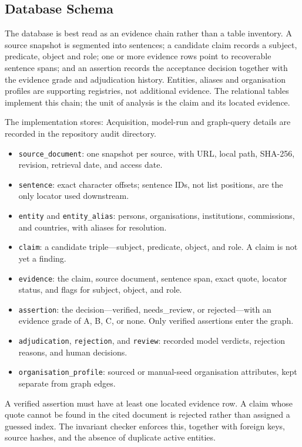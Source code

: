 \documentclass[11pt,a4paper]{article}
\begin{document}
\subsection{Database Schema}

The database is best read as an evidence chain rather than a table inventory. A source snapshot is segmented into sentences; a candidate claim records a subject, predicate, object and role; one or more evidence rows point to recoverable sentence spans; and an assertion records the acceptance decision together with the evidence grade and adjudication history. Entities, aliases and organisation profiles are supporting registries, not additional evidence. The relational tables implement this chain; the unit of analysis is the claim and its located evidence.

The implementation stores: Acquisition, model-run and graph-query details are recorded in the repository audit directory.



\begin{itemize}
\item \texttt{source\_document}: one snapshot per source, with URL, local path, SHA-256, revision, retrieval date, and access date.
\item \texttt{sentence}: exact character offsets; sentence IDs, not list positions, are the only locator used downstream.
\item \texttt{entity} and \texttt{entity\_alias}: persons, organisations, institutions, commissions, and countries, with aliases for resolution.
\item \texttt{claim}: a candidate triple---subject, predicate, object, and role. A claim is not yet a finding.
\item \texttt{evidence}: the claim, source document, sentence span, exact quote, locator status, and flags for subject, object, and role.
\item \texttt{assertion}: the decision---verified, needs\_review, or rejected---with an evidence grade of A, B, C, or none. Only verified assertions enter the graph.
\item \texttt{adjudication}, \texttt{rejection}, and \texttt{review}: recorded model verdicts, rejection reasons, and human decisions.
\item \texttt{organisation\_profile}: sourced or manual-seed organisation attributes, kept separate from graph edges.
\end{itemize}

A verified assertion must have at least one located evidence row. A claim whose quote cannot be found in the cited document is rejected rather than assigned a guessed index. The invariant checker enforces this, together with foreign keys, source hashes, and the absence of duplicate active entities.
\end{document}
